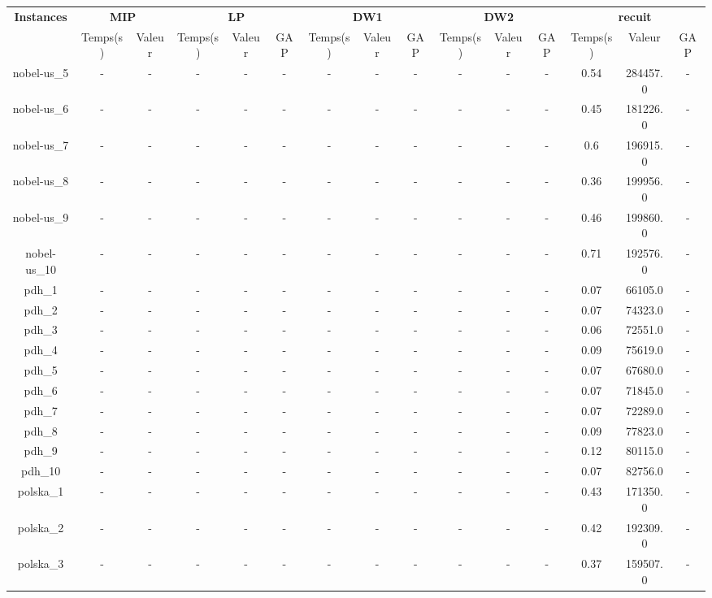 \documentclass[main.tex]{subfiles}
\begin{document}
\begin{landscape}
\begin{table}[h]
    \centering
    \begin{tabular}{c|cc|ccc|ccc|ccc|ccc}
	\hline	
	\textbf{Instances} &\multicolumn{2}{c}{\textbf{MIP}} &\multicolumn{3}{c}{\textbf{LP}} &\multicolumn{3}{c}{\textbf{DW1}} &\multicolumn{3}{c}{\textbf{DW2}} &\multicolumn{3}{c}{\textbf{recuit}}\\
	 &Temps(s) &Valeur &Temps(s) &Valeur &GAP &Temps(s) &Valeur &GAP &Temps(s) &Valeur &GAP &Temps(s) &Valeur &GAP\\

	\hline
	nobel-us\_5 &- &- &- &- &- &- &- &- &- &- &- &0.54 &284457.0 &-\\
	nobel-us\_6 &- &- &- &- &- &- &- &- &- &- &- &0.45 &181226.0 &-\\
	nobel-us\_7 &- &- &- &- &- &- &- &- &- &- &- &0.6 &196915.0 &-\\
	nobel-us\_8 &- &- &- &- &- &- &- &- &- &- &- &0.36 &199956.0 &-\\
	nobel-us\_9 &- &- &- &- &- &- &- &- &- &- &- &0.46 &199860.0 &-\\
	nobel-us\_10 &- &- &- &- &- &- &- &- &- &- &- &0.71 &192576.0 &-\\
	pdh\_1 &- &- &- &- &- &- &- &- &- &- &- &0.07 &66105.0 &-\\
	pdh\_2 &- &- &- &- &- &- &- &- &- &- &- &0.07 &74323.0 &-\\
	pdh\_3 &- &- &- &- &- &- &- &- &- &- &- &0.06 &72551.0 &-\\
	pdh\_4 &- &- &- &- &- &- &- &- &- &- &- &0.09 &75619.0 &-\\
	pdh\_5 &- &- &- &- &- &- &- &- &- &- &- &0.07 &67680.0 &-\\
	pdh\_6 &- &- &- &- &- &- &- &- &- &- &- &0.07 &71845.0 &-\\
	pdh\_7 &- &- &- &- &- &- &- &- &- &- &- &0.07 &72289.0 &-\\
	pdh\_8 &- &- &- &- &- &- &- &- &- &- &- &0.09 &77823.0 &-\\
	pdh\_9 &- &- &- &- &- &- &- &- &- &- &- &0.12 &80115.0 &-\\
	pdh\_10 &- &- &- &- &- &- &- &- &- &- &- &0.07 &82756.0 &-\\
	polska\_1 &- &- &- &- &- &- &- &- &- &- &- &0.43 &171350.0 &-\\
	polska\_2 &- &- &- &- &- &- &- &- &- &- &- &0.42 &192309.0 &-\\
	polska\_3 &- &- &- &- &- &- &- &- &- &- &- &0.37 &159507.0 &-\\

\end{tabular}
\end{table}
\end{landscape}
\end{document}
